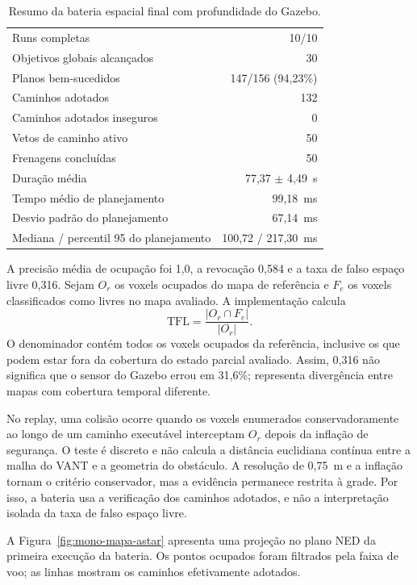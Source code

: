 \begin{table}[htb]
\centering
\caption{Resumo da bateria espacial final com profundidade do Gazebo.}
\label{tab:mono-bateria}
\begin{tabular}{lr}
\hline
Runs completas & 10/10 \\
Objetivos globais alcançados & 30 \\
Planos bem-sucedidos & 147/156 (94,23\%) \\
Caminhos adotados & 132 \\
Caminhos adotados inseguros & 0 \\
Vetos de caminho ativo & 50 \\
Frenagens concluídas & 50 \\
Duração média & 77,37 $\pm$ 4,49~s \\
Tempo médio de planejamento & 99,18~ms \\
Desvio padrão do planejamento & 67,14~ms \\
Mediana / percentil 95 do planejamento & 100,72 / 217,30~ms \\
\hline
\end{tabular}
\end{table}

A precisão média de ocupação foi 1,0, a revocação 0,584 e a taxa de falso espaço livre 0,316. Sejam $O_r$ os voxels ocupados do mapa de referência e $F_e$ os voxels classificados como livres no mapa avaliado. A implementação calcula
\[
\mathrm{TFL}=\frac{|O_r\cap F_e|}{|O_r|}.
\]
O denominador contém todos os voxels ocupados da referência, inclusive os que podem estar fora da cobertura do estado parcial avaliado. Assim, 0,316 não significa que o sensor do Gazebo errou em 31,6\%; representa divergência entre mapas com cobertura temporal diferente.

No replay, uma colisão ocorre quando os voxels enumerados conservadoramente ao longo de um caminho executável interceptam $O_r$ depois da inflação de segurança. O teste é discreto e não calcula a distância euclidiana contínua entre a malha do VANT e a geometria do obstáculo. A resolução de 0,75~m e a inflação tornam o critério conservador, mas a evidência permanece restrita à grade. Por isso, a bateria usa a verificação dos caminhos adotados, e não a interpretação isolada da taxa de falso espaço livre.

A Figura~\ref{fig:mono-mapa-astar} apresenta uma projeção no plano NED da primeira execução da bateria. Os pontos ocupados foram filtrados pela faixa de voo; as linhas mostram os caminhos efetivamente adotados.

